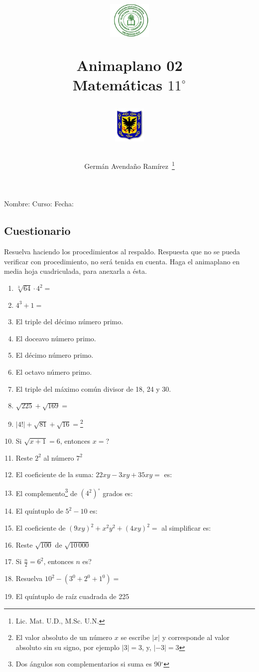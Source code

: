 \documentclass[letterpaper,10pt,twoside]{article}
\author{Germ\'an Avenda\~no Ram\'irez~\thanks{Lic. Mat. U.D., M.Sc. U.N.}}
\title{\begin{minipage}{.2\textwidth}
\includegraphics[height=1.75cm]{Images/logo-colegio.png}\end{minipage}
\begin{minipage}{.55\textwidth}
\begin{center}
Animaplano 02\\
Matemáticas $11^{\circ}$
\end{center}
\end{minipage}\hfill
\begin{minipage}{.2\textwidth}
\includegraphics[height=1.75cm]{Images/logo-sed.png} 
\end{minipage}}
\date{}
\begin{document}
\maketitle
Nombre: \hrulefill Curso: \underline{\hspace*{44pt}} Fecha: \underline{\hspace*{2.5cm}}
\begin{multicols}{2}
\section*{Cuestionario}
Resuelva haciendo los procedimientos al respaldo. Respuesta que no se pueda verificar con procedimiento, no será tenida en cuenta. Haga el animaplano en media hoja cuadriculada, para anexarla a ésta.
 \begin{enumerate}
 \item $\sqrt[3]{64}\cdot 4^{2}=$
 \item $4^{3}+1=$
 \item El triple del décimo número primo.
 \item El doceavo número primo.
 \item El décimo número primo.
 \item El octavo número primo.
 \item El triple del máximo común divisor de 18, 24 y 30.
 \item $\sqrt{225}+\sqrt{169}=$
 \item $|4!|+\sqrt{81}+\sqrt{16}=$\footnote{El valor absoluto de un número $x$ se escribe $|x|$ y corresponde al valor absoluto sin su signo, por ejemplo $|3|=3$, y, $|-3|=3$}
 \item Si $\sqrt{x+1}=6$, entonces $x=$?
 \item Reste $2^{2}$ al número $7^{2}$
 \item El coeficiente de la suma: $22xy-3xy+35xy=$ es:
 \item El complemento\footnote{Dos ángulos son complementarios si suma es 90$^{\circ}$} de $(4^{2})^{\circ}$ grados es:
 \item El quíntuplo de $5^{2}-10$ es:
 \item El coeficiente de $(9xy)^{2}+x^{2}y^{2}+(4xy)^{2}=$ al simplificar es:
 \item Reste $\sqrt{100}$ de $\sqrt{10\,000}$
 \item Si $\frac{n}{2}=6^{2}$, entonces $n$ es?
 \item Resuelva $10^{2}-(3^{0}+2^{0}+1^{0})=$
 \item El quíntuplo de raíz cuadrada de 225

\end{enumerate}
\end{multicols}
\end{document}
